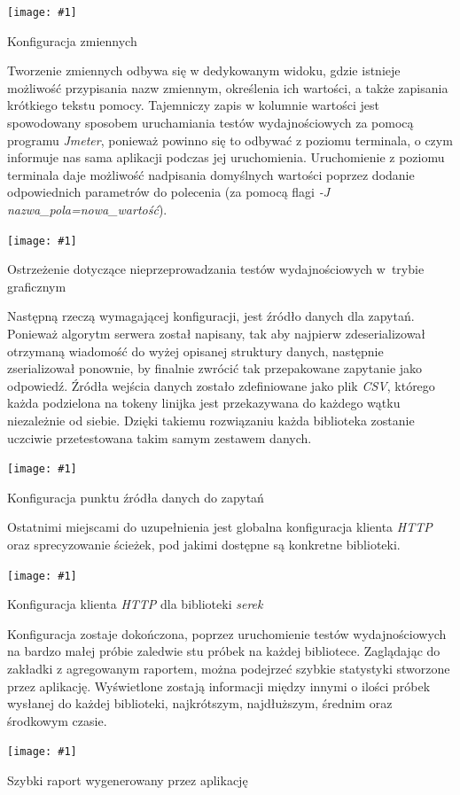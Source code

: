 \documentclass[12pt]{article}
\newcommand{\n}{\newline}
\newcommand{\putss}[3]{
\begin{screenshot}[H]
	\centering
	\texttt{[image: \#1]}
	\caption{#2}
	\label{#3}
	\medskip
\end{screenshot}
}
\newcommand{\nonpl}[1]{{\it #1}}
\newcommand{\code}[1]{{\it #1}}
\newcommand{\HTTP}{\nonpl{HTTP} }
\newcommand{\Jmeter}{\nonpl{Jmeter}\texttrademark}
\newcommand{\serek}{\nonpl{serek}}
\begin{document}
{{{				\putss{./img/jmeter_ss/variables.png}{ Konfiguracja zmiennych}{jmeter_var_config}

				Tworzenie zmiennych odbywa się w dedykowanym widoku, gdzie istnieje możliwość przypisania nazw zmiennym, określenia ich wartości, a także zapisania krótkiego
				tekstu pomocy. Tajemniczy zapis w kolumnie wartości jest spowodowany sposobem uruchamiania testów wydajnościowych za pomocą programu \Jmeter,
				ponieważ powinno się to odbywać z poziomu terminala, o czym informuje nas sama aplikacji podczas jej uruchomienia. Uruchomienie z poziomu terminala daje możliwość
				nadpisania domyślnych wartości poprzez dodanie odpowiednich parametrów do polecenia (za pomocą flagi \code{-J nazwa\_pola=nowa\_wartość}).\n

				\putss{./img/jmeter_ss/jmeter_gui_warn.png}{ Ostrzeżenie dotyczące nieprzeprowadzania testów wydajnościowych w~trybie graficznym}{jmeter_warn}

				Następną rzeczą wymagającej konfiguracji, jest źródło danych dla zapytań. Ponieważ algorytm serwera został napisany, tak aby najpierw zdeserializował otrzymaną
				wiadomość do wyżej opisanej struktury danych, następnie zserializował ponownie, by finalnie zwrócić tak przepakowane zapytanie jako odpowiedź. Źródła wejścia danych
				zostało zdefiniowane jako plik \nonpl{CSV}, którego każda podzielona na tokeny linijka jest przekazywana do każdego wątku niezależnie od siebie. Dzięki takiemu rozwiązaniu
				każda biblioteka zostanie uczciwie przetestowana takim samym zestawem danych.\n


				\putss{./img/jmeter_ss/csv_config.png}{ Konfiguracja punktu źródła danych do zapytań}{jmeter_config_csv}

				Ostatnimi miejscami do uzupełnienia jest globalna konfiguracja klienta \HTTP oraz sprecyzowanie ścieżek, pod jakimi dostępne są konkretne biblioteki.

				\putss{./img/jmeter_ss/http_serek_config.png}{ Konfiguracja klienta \HTTP dla biblioteki \serek}{jmeter_config_http}

				Konfiguracja zostaje dokończona, poprzez uruchomienie testów wydajnościowych na bardzo małej próbie zaledwie stu próbek
				na każdej bibliotece. Zaglądając do zakładki z agregowanym raportem, można podejrzeć szybkie statystyki stworzone przez aplikację. Wyświetlone
				zostają informacji między innymi o ilości próbek wysłanej do każdej biblioteki, najkrótszym, najdłuższym, średnim oraz środkowym czasie.

				\putss{./img/jmeter_ss/aggregate_report.png}{ Szybki raport wygenerowany przez aplikację}{jmeter_report}
			}

}}
\end{document}
